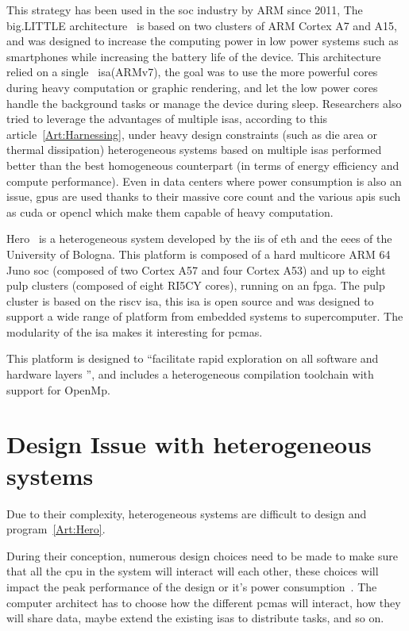 This strategy has been used in the \gls{soc} industry by ARM since 2011, The  big.LITTLE architecture~\cite{Art:bigLITTLE} is based on two clusters of ARM Cortex A7 and A15, and was designed to increase the computing power in low power systems such as smartphones while increasing the battery life of the device. This architecture relied on a single~ \gls{isa}(ARMv7), the goal was to use the more powerful cores during heavy computation or graphic rendering, and let the low power cores handle the background tasks or manage the device during sleep. Researchers also tried to leverage the advantages of multiple \glspl{isa}, according to this article~\ref{Art:Harnessing}, under heavy design constraints (such as die area or thermal dissipation) heterogeneous systems based on multiple \glspl{isa} performed better than the best homogeneous counterpart (in terms of energy efficiency and compute performance). 
Even in data centers where power consumption is also an issue, \glspl{gpu} are used thanks to their massive core count and the various \glspl{api} such as \gls{cuda} or \gls{opencl} which make them capable of heavy computation.

    Hero~\cite{Art:Hero} is a heterogeneous system developed by the \gls{iis} of \acrshort{eth} and the \gls{eees} of the University of Bologna. This platform is composed of a hard multicore ARM 64 Juno \gls{soc} (composed of two Cortex A57 and four Cortex A53) and up to eight \gls{pulp} clusters (composed of eight RI5CY cores), running on an \gls{fpga}. 
    The \gls{pulp} cluster is based on the \gls{riscv} \gls{isa}, this \gls{isa} is open source and was designed to support a wide range of platform from embedded systems to supercomputer. The modularity of the \gls{isa} makes it interesting for \glspl{pcma}.

    This platform is designed to ``facilitate rapid exploration on all software and hardware layers '', and includes a heterogeneous compilation toolchain with support for OpenMp.



\section {Design Issue with heterogeneous systems}
    Due to their complexity, heterogeneous systems are difficult to design and program~\ref{Art:Hero}.

    During their conception, numerous design choices need to be made to make sure that all the \gls{cpu} in the system will interact will each other, these choices will impact the peak performance of the design or it's power consumption~\cite{Art:Harnessing}. The computer architect has to choose how the different \glspl{pcma} will interact, how they will share data, maybe extend the existing \glspl{isa} to distribute tasks, and so on.

